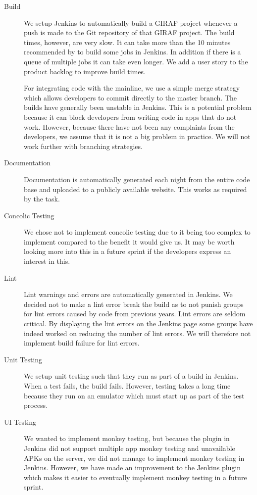 \begin{description}
  \item[Build] We setup Jenkins to automatically build a GIRAF project whenever a push is made to the Git repository of that GIRAF project. The build times, however, are very slow. It can take more than the 10 minutes recommended by \textcite{beck2004} to build some jobs in Jenkins. In addition if there is a queue of multiple jobs it can take even longer. We add a user story to the product backlog to improve build times.

  For integrating code with the mainline, we use a simple merge strategy which allows developers to commit directly to the master branch. The builds have generally been unstable in Jenkins. This is a potential problem because it can block developers from writing code in apps that do not work. However, because there have not been any complaints from the developers, we assume that it is not a big problem in practice. We will not work further with branching strategies.
  \item[Documentation] Documentation is automatically generated each night from the entire code base and uploaded to a publicly available website. This works as required by the task.
  \item[Concolic Testing] We chose not to implement concolic testing due to it being too complex to implement compared to the benefit it would give us. It may be worth looking more into this in a future sprint if the developers express an interest in this.
  \item[Lint] Lint warnings and errors are automatically generated in Jenkins. We decided not to make a lint error break the build as to not punish groups for lint errors caused by code from previous years. Lint errors are seldom critical. By displaying the lint errors on the Jenkins page some groups have indeed worked on reducing the number of lint errors. We will therefore not implement build failure for lint errors.
  \item[Unit Testing] We setup unit testing such that they run as part of a build in Jenkins. When a test fails, the build fails. However, testing takes a long time because they run on an emulator which must start up as part of the test process.
  \item[UI Testing] We wanted to implement monkey testing, but because the plugin in Jenkins did not support multiple app monkey testing and unavailable APKs on the server, we did not manage to implement monkey testing in Jenkins. However, we have made an improvement to the Jenkins plugin which makes it easier to eventually implement monkey testing in a future sprint.
\end{description}


